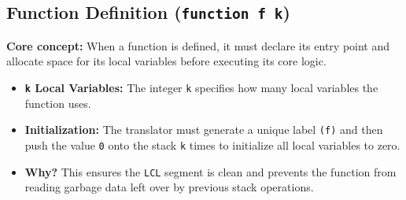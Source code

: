 \documentclass[12pt,a4paper]{article}
\begin{document}
\subsection{Function Definition (\texttt{function f k})}
\textbf{Core concept:} When a function is defined, it must declare its entry point and allocate space for its local variables before executing its core logic.
\begin{itemize}
    \item \textbf{\texttt{k} Local Variables:} The integer \texttt{k} specifies how many local variables the function uses.
    \item \textbf{Initialization:} The translator must generate a unique label \texttt{(f)} and then push the value \texttt{0} onto the stack \texttt{k} times to initialize all local variables to zero.
    \item \textbf{Why?} This ensures the \texttt{LCL} segment is clean and prevents the function from reading garbage data left over by previous stack operations.
\end{itemize}
\end{document}
